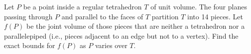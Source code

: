 Let $P$ be a point inside a regular tetrahedron $T$ of unit volume. The four planes passing through $P$ and parallel to the faces of $T$ partition $T$ into 14 pieces. Let $f(P)$ be the joint volume of those pieces that are neither a tetrahedron nor a parallelepiped (i.e., pieces adjacent to an edge but not to a vertex). Find the exact bounds for $f(P)$ as $P$ varies over $T$.
